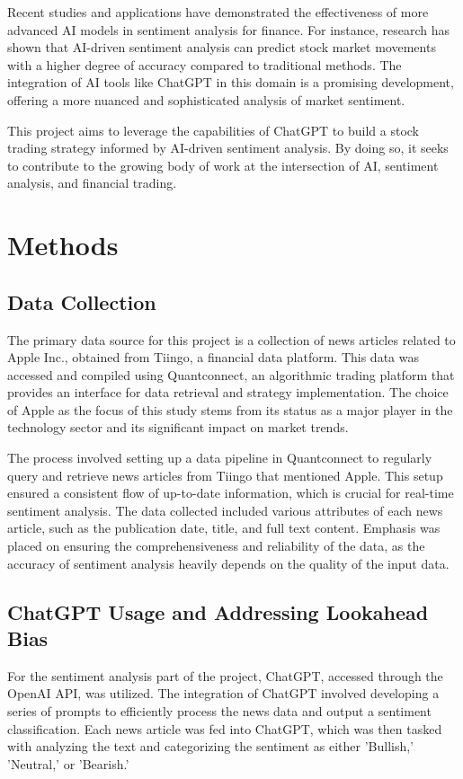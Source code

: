 Recent studies and applications have demonstrated the effectiveness of more advanced AI models in sentiment analysis for finance. For instance, research has shown that AI-driven sentiment analysis can predict stock market movements with a higher degree of accuracy compared to traditional methods. The integration of AI tools like ChatGPT in this domain is a promising development, offering a more nuanced and sophisticated analysis of market sentiment.

This project aims to leverage the capabilities of ChatGPT to build a stock trading strategy informed by AI-driven sentiment analysis. By doing so, it seeks to contribute to the growing body of work at the intersection of AI, sentiment analysis, and financial trading.

\section{Methods}

\subsection{Data Collection}

The primary data source for this project is a collection of news articles related to Apple Inc., obtained from Tiingo, a financial data platform. This data was accessed and compiled using Quantconnect, an algorithmic trading platform that provides an interface for data retrieval and strategy implementation. The choice of Apple as the focus of this study stems from its status as a major player in the technology sector and its significant impact on market trends.

The process involved setting up a data pipeline in Quantconnect to regularly query and retrieve news articles from Tiingo that mentioned Apple. This setup ensured a consistent flow of up-to-date information, which is crucial for real-time sentiment analysis. The data collected included various attributes of each news article, such as the publication date, title, and full text content. Emphasis was placed on ensuring the comprehensiveness and reliability of the data, as the accuracy of sentiment analysis heavily depends on the quality of the input data.



\subsection{ChatGPT Usage and Addressing Lookahead Bias}
For the sentiment analysis part of the project, ChatGPT, accessed through the OpenAI API, was utilized. The integration of ChatGPT involved developing a series of prompts to efficiently process the news data and output a sentiment classification. Each news article was fed into ChatGPT, which was then tasked with analyzing the text and categorizing the sentiment as either 'Bullish,' 'Neutral,' or 'Bearish.'

